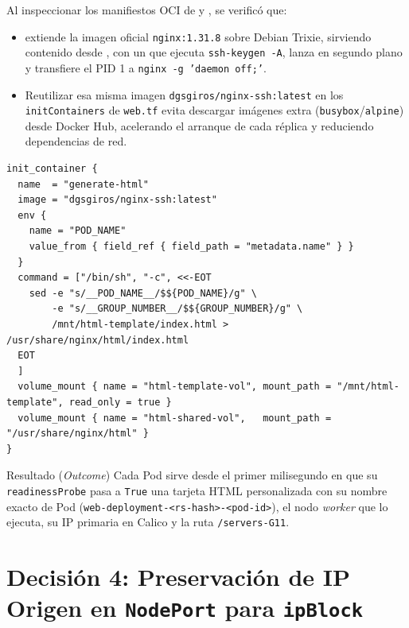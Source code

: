 Al inspeccionar los manifiestos OCI de  y , se verificó que:
\begin{itemize}
  \item {} extiende la imagen oficial \texttt{nginx:1.31.8} sobre Debian Trixie, sirviendo contenido desde \textbf{}, con un  que ejecuta \texttt{ssh-keygen -A}, lanza  en segundo plano y transfiere el PID 1 a \texttt{nginx -g 'daemon off;'}.
  \item Reutilizar esa misma imagen \texttt{dgsgiros/nginx-ssh:latest} en los \texttt{initContainers} de \texttt{web.tf} evita descargar imágenes extra (\texttt{busybox}/\texttt{alpine}) desde Docker Hub, acelerando el arranque de cada réplica y reduciendo dependencias de red.
\end{itemize}

\begin{lstlisting}[language=HCL,caption={Fragmento del \texttt{initContainer} (Opción B) en \texttt{terraform/web.tf} con \textit{Downward API}.}]
init_container {
  name  = "generate-html"
  image = "dgsgiros/nginx-ssh:latest"
  env {
    name = "POD_NAME"
    value_from { field_ref { field_path = "metadata.name" } }
  }
  command = ["/bin/sh", "-c", <<-EOT
    sed -e "s/__POD_NAME__/$${POD_NAME}/g" \
        -e "s/__GROUP_NUMBER__/$${GROUP_NUMBER}/g" \
        /mnt/html-template/index.html > /usr/share/nginx/html/index.html
  EOT
  ]
  volume_mount { name = "html-template-vol", mount_path = "/mnt/html-template", read_only = true }
  volume_mount { name = "html-shared-vol",   mount_path = "/usr/share/nginx/html" }
}
\end{lstlisting}

\begin{outcomebox}{Resultado (\textit{Outcome})}
Cada Pod sirve desde el primer milisegundo en que su \texttt{readinessProbe} pasa a \texttt{True} una tarjeta HTML personalizada con su nombre exacto de Pod (\texttt{web-deployment-<rs-hash>-<pod-id>}), el nodo \textit{worker} que lo ejecuta, su IP primaria en Calico y la ruta \texttt{/servers-G11}.
\end{outcomebox}

\section{Decisión 4: Preservación de IP Origen en \texttt{NodePort} para \texttt{ipBlock}}

